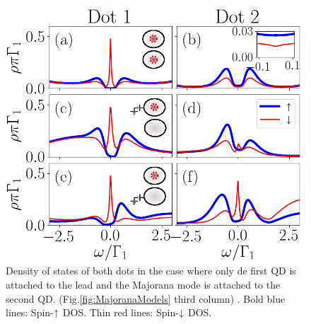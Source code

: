 \documentclass[showpacs,aps,prb,reprint,superscriptaddress]{revtex4-1}
\begin{document}
\begin{figure}[bt]
\begin{center}
\includegraphics[scale=0.45]{Graficos/b)Nt2>0.png}
\caption{  \label{fig:Nt2>0} Density of states of both dots in the case where only de first QD is attached to the lead and the Majorana mode is attached to the second QD.  (Fig.\ref{fig:MajoranaModels} third column) . Bold blue lines: Spin-$\uparrow$ DOS. Thin red lines: Spin-$\downarrow$ DOS. 
}
%

\end{center}
\end{figure}
 







\end{document}
